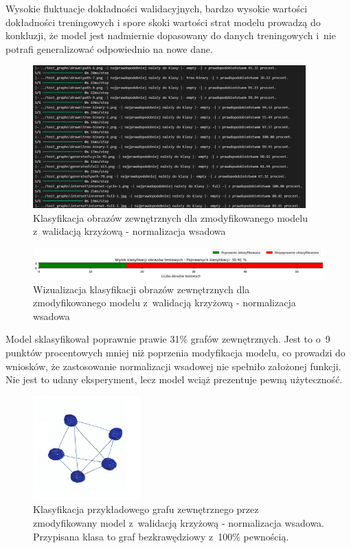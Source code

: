 Wysokie fluktuacje dokładności walidacyjnych, bardzo wysokie wartości dokładności treningowych
i spore skoki wartości strat modelu prowadzą do konkluzji,
że model jest nadmiernie dopasowany do danych treningowych i~nie potrafi generalizować odpowiednio na nowe dane.

\begin{figure}[ht]
	\centering
	\includegraphics[height=5.5cm]{resources/tests/images/v4/crossvalid_2_txt.png}
	\caption{Klasyfikacja obrazów zewnętrznych dla zmodyfikowanego modelu z~walidacją krzyżową - normalizacja wsadowa}
	\label{Fig:tests-cv-2b}
\end{figure}
\FloatBarrier

\begin{figure}[ht]
	\centering
	\includegraphics[width=15.5cm]{resources/tests/images/v4/crossvalid_2_bar.png}
	\caption{Wizualizacja klasyfikacji obrazów zewnętrznych dla zmodyfikowanego modelu z~walidacją krzyżową - normalizacja wsadowa}
	\label{Fig:tests-cv-2c}
\end{figure}
\FloatBarrier

Model sklasyfikował poprawnie prawie 31\% grafów zewnętrznych.
Jest to o~9 punktów procentowych mniej niż poprzenia modyfikacja modelu,
co prowadzi do wniosków, że zastosowanie normalizacji wsadowej nie spełniło założonej funkcji.
Nie jest to udany eksperyment, lecz model wciąż prezentuje pewną użyteczność.

\begin{figure}[ht]
	\centering
	\includegraphics[height=4cm]{../graph_classification/test_graphs/drawn/full-8.png}
	\caption{Klasyfikacja przykładowego grafu zewnętrznego przez zmodyfikowany model z~walidacją krzyżową - normalizacja wsadowa.
		Przypisana klasa to graf bezkrawędziowy z~100\% pewnością.}
	\label{Fig:tests-cv-2d}
\end{figure}
\FloatBarrier

